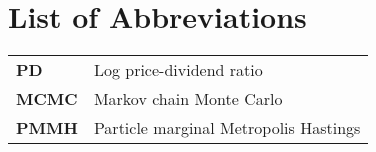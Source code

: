 \chapter{List of Abbreviations}
\begin{tabular}{ll}
\textbf{PD} & Log price-dividend ratio \\
\textbf{MCMC} & Markov chain Monte Carlo \\
\textbf{PMMH} & Particle marginal Metropolis Hastings \\
\end{tabular}
